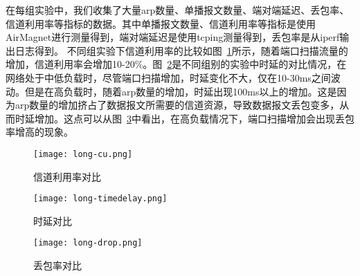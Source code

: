 

在每组实验中，我们收集了大量arp数量、单播报文数量、端对端延迟、丢包率、信道利用率等指标的数据。其中单播报文数量、信道利用率等指标是使用AirMagnet\cite{airmagnet}进行测量得到，端对端延迟是使用tcping测量得到，丢包率是从iperf输出日志得到。
不同组实验下信道利用率的比较如图~\ref{fig:信道利用率对比}所示，随着端口扫描流量的增加，信道利用率会增加10-20\%。图~\ref{fig:时延对比}是不同组别的实验中时延的对比情况，在网络处于中低负载时，尽管端口扫描增加，时延变化不大，仅在10-30ms之间波动。但是在高负载时，随着arp数量的增加，时延出现100ms以上的增加。这是因为arp数量的增加挤占了数据报文所需要的信道资源，导致数据报文丢包变多，从而时延增加。这点可以从图~\ref{fig:丢包率对比}中看出，在高负载情况下，端口扫描增加会出现丢包率增高的现象。
\begin{figure}
  \centering
  \texttt{[image: long-cu.png]}
  \caption{信道利用率对比}
  \label{fig:信道利用率对比}
\end{figure}

\begin{figure}
  \centering
  \texttt{[image: long-timedelay.png]}
  \caption{时延对比}
  \label{fig:时延对比}
\end{figure}

\begin{figure}
  \centering
  \texttt{[image: long-drop.png]}
  \caption{丢包率对比}
  \label{fig:丢包率对比}
\end{figure}


